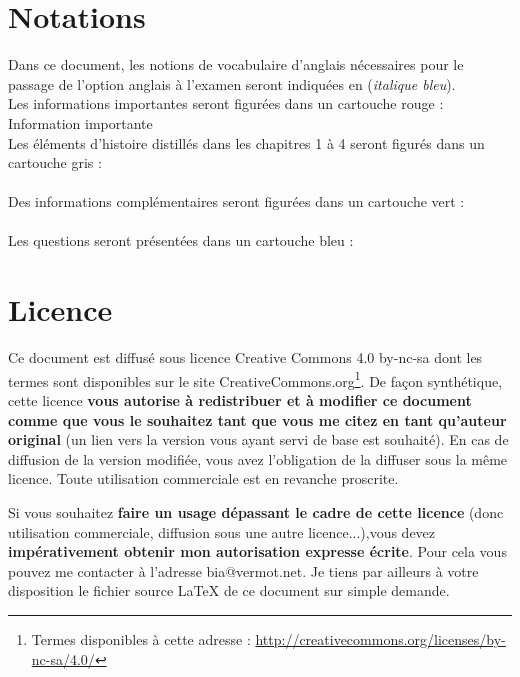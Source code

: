 \documentclass[a4paper,12pt,oneside]{report} %
\newcommand{\anglais}[1]{(\textit{\color{blue}#1})}
\begin{document}
	
	
	\section{Notations}
	Dans ce document, les notions de vocabulaire d'anglais nécessaires pour le passage de l'option anglais à l'examen seront indiquées en \anglais{italique bleu}. \\
	
	Les informations importantes seront figurées dans un cartouche rouge : \nobreak\\
	\alert{Information importante}\\
	
	Les éléments d'histoire distillés dans les chapitres 1 à 4 seront figurés dans un cartouche gris :\nobreak\\
	 \\
	
	Des informations complémentaires seront figurées dans un cartouche vert : \nobreak\\
	 \\
	
	Les questions seront présentées dans un cartouche bleu :  \nobreak\\

	\section{Licence}
	Ce document est diffusé sous licence Creative Commons 4.0 by-nc-sa dont les termes sont disponibles sur le site CreativeCommons.org\footnote{Termes disponibles à cette adresse : \url{http://creativecommons.org/licenses/by-nc-sa/4.0/}}. De façon synthétique, cette licence \textbf{vous autorise à redistribuer et à modifier ce document comme que vous le souhaitez tant que vous me citez en tant qu'auteur original} (un lien vers la version vous ayant servi de base est souhaité). En cas de diffusion de la version modifiée, vous avez l'obligation de la diffuser sous la même licence. Toute utilisation commerciale est en revanche proscrite. 
	
	Si vous souhaitez \textbf{faire un usage dépassant le cadre de cette licence} (donc utilisation commerciale, diffusion sous une autre licence...),vous devez \textbf{impérativement obtenir mon autorisation expresse écrite}. Pour cela vous pouvez me contacter à l'adresse bia@vermot.net. Je tiens par ailleurs à votre disposition le fichier source \LaTeX{} de ce document sur simple demande.
\end{document}
